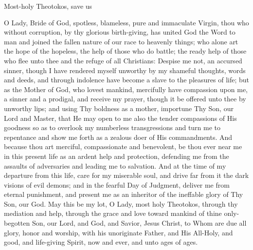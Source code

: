 \documentclass[twoside, letterpaper, 12pt]{report}
\begin{document}


\begin{reader}
  \item \lhmTwelve
  \item Most-holy Theotokos, save us
\end{reader}

\begin{maybetwocolumns}

O Lady, Bride of God, spotless, blameless, pure and immaculate Virgin,
thou who without corruption, by thy glorious birth-giving,
has united God the Word to man and joined the fallen nature of our race to heavenly things;
who alone art the hope of the hopeless, the help of those who do battle;
the ready help of those who flee unto thee and the refuge of all Christians:
Despise me not, an accursed sinner,
though I have rendered myself unworthy by my shameful thoughts, words and deeds,
and through indolence have become a slave to the pleasures of life;
but as the Mother of God, who lovest mankind, mercifully have compassion upon me,
a sinner and a prodigal, and receive my prayer,
though it be offered unto thee by unworthy lips;
and using Thy boldness as a mother, importune Thy Son, our Lord and Master,
that He may open to me also the tender compassions of His goodness
so as to overlook my numberless transgressions and turn me to repentance
and show me forth as a zealous doer of His commandments.
And because thou art merciful, compassionate and benevolent,
be thou ever near me in this present life as an ardent help and protection,
defending me from the assaults of adversaries and leading me to salvation.
And at the time of my departure from this life, care for my miserable soul,
and drive far from it the dark visions of evil demons; and in the fearful Day of Judgment,
deliver me from eternal punishment,
and present me as an inheritor of the ineffable glory of Thy Son, our God.
May this be my lot, O Lady, most holy Theotokos,
through thy mediation and help,
through the grace and love toward mankind of thine only-begotten Son,
our Lord, and God, and Savior, Jesus Christ,
to Whom are due all glory, honor and worship,
with his unoriginate Father, and His All-Holy, and good, and life-giving Spirit,
now and ever, and unto ages of ages.


\end{maybetwocolumns}
\end{document}
